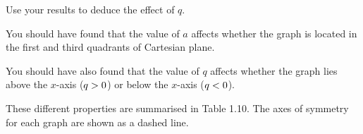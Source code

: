 \begin{enumerate}[noitemsep, label=\textbf{\arabic*}. ]
Use your results to deduce the effect of \begin{math}q\end{math}.
\end{enumerate}
        
        

        \label{m39341*id246723}You should have found that the value of \begin{math}a\end{math} affects whether the graph is located in the first and third quadrants of Cartesian plane.\par 
        \label{m39341*id246740}You should have also found that the value of \begin{math}q\end{math} affects whether the graph lies above the \begin{math}x\end{math}-axis (\begin{math}q>{}0\end{math}) or below the \begin{math}x\end{math}-axis (\begin{math}q<{}0\end{math}).\par 
        \label{m39341*id246801}These different properties are summarised in Table 1.10. The axes of symmetry for each graph are shown as a dashed line.\par 
        
    
      
    
    \setlength\mytablespace{6\tabcolsep}
    \addtolength\mytablespace{4\arrayrulewidth}
    \setlength\mytablewidth{\linewidth}
        
